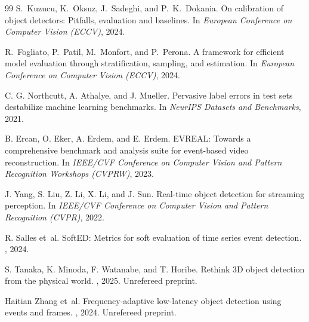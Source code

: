 \documentclass[10pt,twocolumn,letterpaper]{article}
\begin{document}
{\begin{thebibliography}{99}
S.~Kuzucu, K.~Oksuz, J.~Sadeghi, and P.~K.~Dokania.
\newblock On calibration of object detectors: Pitfalls, evaluation and baselines.
\newblock In {\em European Conference on Computer Vision (ECCV)}, 2024.

R.~Fogliato, P.~Patil, M.~Monfort, and P.~Perona.
\newblock A framework for efficient model evaluation through stratification, sampling, and
estimation.
\newblock In {\em European Conference on Computer Vision (ECCV)}, 2024.

C. G. Northcutt, A. Athalye, and J. Mueller.
\newblock Pervasive label errors in test sets destabilize machine learning
benchmarks.
\newblock In {\em NeurIPS Datasets and Benchmarks}, 2021.

B. Ercan, O. Eker, A. Erdem, and E. Erdem.
\newblock EVREAL: Towards a comprehensive benchmark and analysis suite for
event-based video reconstruction.
\newblock In {\em IEEE/CVF Conference on Computer Vision and Pattern Recognition
Workshops (CVPRW)}, 2023.

J. Yang, S. Liu, Z. Li, X. Li, and J. Sun.
\newblock Real-time object detection for streaming perception.
\newblock In {\em IEEE/CVF Conference on Computer Vision and Pattern Recognition
(CVPR)}, 2022.

R. Salles et~al.
SoftED: Metrics for soft evaluation of time series event detection.
, 2024.

S. Tanaka, K. Minoda, F. Watanabe, and T. Horibe.
\newblock Rethink 3D object detection from the physical world.
, 2025. Unrefereed preprint.

Haitian Zhang et~al.
Frequency-adaptive low-latency object detection using events and frames.
, 2024. Unrefereed preprint.

\end{thebibliography}
}
\end{document}
